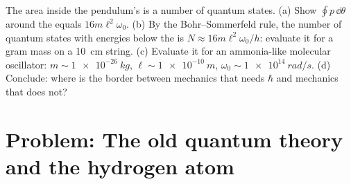 \begin{exercise}[$\star\star\star$]\label{exo:b3:hamiltonian-mechanics:12}
The area inside the pendulum's  is a number of quantum
states. (a) Show $\oint p\,\dd\theta$ around the  equals
$16m\ell^2\omega_0$. (b) By the Bohr--Sommerfeld rule, the number of
quantum states with energies below the  is $N \approx
16m\ell^2\omega_0/h$: evaluate it for a gram mass on a
\qty{10}{cm} string. (c) Evaluate it for an ammonia-like molecular
oscillator: $m \sim \qty{1e-26}{kg}$, $\ell \sim \qty{1e-10}{m}$,
$\omega_0 \sim \qty{1e14}{rad/s}$. (d) Conclude: where is the border
between mechanics that needs $\hbar$ and mechanics that does not?
\end{exercise}

\section{Problem: The old quantum theory and the hydrogen atom}

